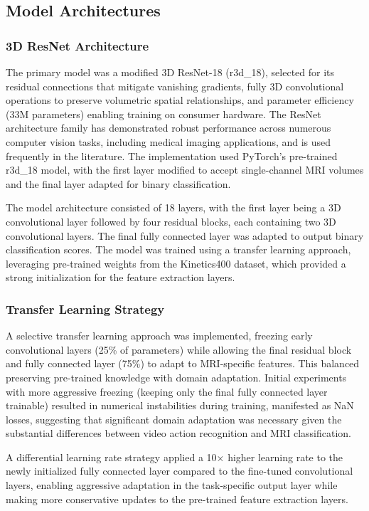 \documentclass[12pt, a4paper]{article}
\begin{document}
\subsection{Model Architectures}
\subsubsection{3D ResNet Architecture}

The primary model was a modified 3D ResNet-18 (r3d\_18), selected for its residual connections that mitigate vanishing gradients, fully 3D convolutional operations to preserve volumetric spatial relationships, and parameter efficiency (33M parameters) enabling training on consumer hardware. The ResNet architecture family has demonstrated robust performance across numerous computer vision tasks, including medical imaging applications, and is used frequently in the literature. The implementation used PyTorch's pre-trained r3d\_18 model, with the first layer modified to accept single-channel MRI volumes and the final layer adapted for binary classification.

The model architecture consisted of 18 layers, with the first layer being a 3D convolutional layer followed by four residual blocks, each containing two 3D convolutional layers. The final fully connected layer was adapted to output binary classification scores. The model was trained using a transfer learning approach, leveraging pre-trained weights from the Kinetics400 dataset, which provided a strong initialization for the feature extraction layers.

\subsubsection{Transfer Learning Strategy}

A selective transfer learning approach was implemented, freezing early convolutional layers (25\% of parameters) while allowing the final residual block and fully connected layer (75\%) to adapt to MRI-specific features. This balanced preserving pre-trained knowledge with domain adaptation. Initial experiments with more aggressive freezing (keeping only the final fully connected layer trainable) resulted in numerical instabilities during training, manifested as NaN losses, suggesting that significant domain adaptation was necessary given the substantial differences between video action recognition and MRI classification.

A differential learning rate strategy applied a 10× higher learning rate to the newly initialized fully connected layer compared to the fine-tuned convolutional layers, enabling aggressive adaptation in the task-specific output layer while making more conservative updates to the pre-trained feature extraction layers.
\end{document}
